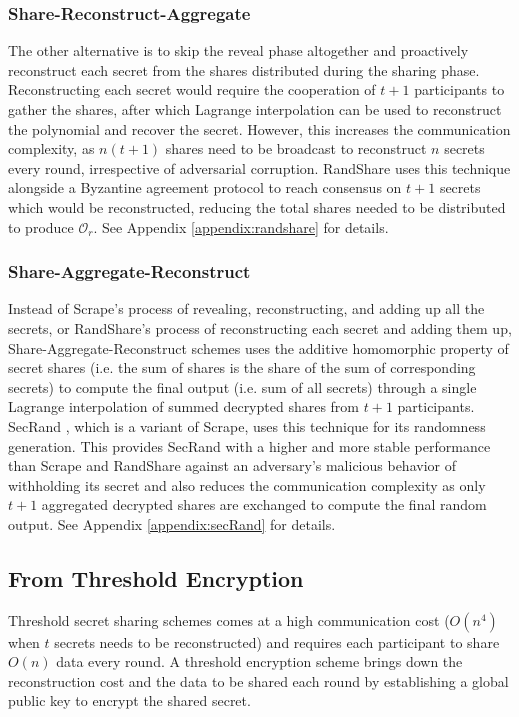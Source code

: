 \documentclass[letterpaper,twocolumn,10pt]{article}
\theoremstyle{definition}
\theoremstyle{remark}
\begin{document}
\subsubsection{Share-Reconstruct-Aggregate}
The other alternative is to skip the reveal phase altogether and proactively reconstruct each secret from the shares distributed during the sharing phase. Reconstructing each secret would require the cooperation of $t + 1$ participants to gather the shares, after which Lagrange interpolation can be used to reconstruct the polynomial and recover the secret. However, this increases the communication complexity, as $n (t + 1)$ shares need to be broadcast to reconstruct $n$ secrets every round, irrespective of adversarial corruption. RandShare \cite{syta2017scalable} uses this technique alongside a Byzantine agreement protocol to reach consensus on $t + 1$ secrets which would be reconstructed, reducing the total shares needed to be distributed to produce $\mathcal{O}_r$. See Appendix \ref{appendix:randshare} for details.

\subsubsection{Share-Aggregate-Reconstruct}
Instead of Scrape's process of revealing, reconstructing, and adding up all the secrets, or RandShare's process of reconstructing each secret and adding them up, Share-Aggregate-Reconstruct schemes uses the additive homomorphic property of secret shares (i.e. the sum of shares is the share of the sum of corresponding secrets) to compute the final output (i.e. sum of all secrets) through a single Lagrange interpolation of summed decrypted shares from $t + 1$ participants. SecRand \cite{guo2020secRand}, which is a variant of Scrape, uses this technique for its randomness generation. This provides SecRand with a higher and more stable performance than Scrape and RandShare against an adversary's malicious behavior of withholding its secret and also reduces the communication complexity as only $t + 1$ aggregated decrypted shares are exchanged to compute the final random output. See Appendix \ref{appendix:secRand} for details.

\subsection{From Threshold Encryption}
Threshold secret sharing schemes comes at a high communication cost ($O(n^4)$ when $t$ secrets needs to be reconstructed) and requires each participant to share $O(n)$ data every round. A threshold encryption scheme brings down the reconstruction cost and the data to be shared each round by establishing a global public key to encrypt the shared secret.
\end{document}

